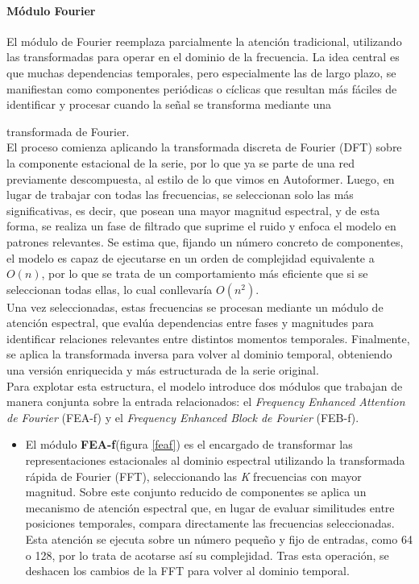 \paragraph{Módulo Fourier}

El módulo de Fourier reemplaza parcialmente la atención tradicional, utilizando las transformadas para operar en el dominio de la frecuencia. La idea central es que muchas dependencias temporales, pero especialmente las de largo plazo, se manifiestan como componentes periódicas o cíclicas que resultan más fáciles de identificar y procesar cuando la señal se transforma mediante una {transformada de Fourier.\\

El proceso comienza aplicando la transformada discreta de Fourier (DFT) sobre la componente estacional de la serie, por lo que ya se parte de una red previamente descompuesta, al estilo de lo que vimos en Autoformer. Luego, en lugar de trabajar con todas las frecuencias, se seleccionan solo las más significativas, es decir, que posean una mayor magnitud espectral, y de esta forma, se realiza un fase de filtrado que suprime el ruido y enfoca el modelo en patrones relevantes. Se estima que, fijando un número concreto de componentes, el modelo es capaz de ejecutarse en un orden de complejidad equivalente a $O(n)$, por lo que se trata de un comportamiento más eficiente que si se seleccionan todas ellas, lo cual conllevaría $O(n^2)$.\\

Una vez seleccionadas, estas frecuencias se procesan mediante un módulo de atención espectral, que evalúa dependencias entre fases y magnitudes para identificar relaciones relevantes entre distintos momentos temporales. Finalmente, se aplica la transformada inversa para volver al dominio temporal, obteniendo una versión enriquecida y más estructurada de la serie original.\\

Para explotar esta estructura, el modelo introduce dos módulos que trabajan de manera conjunta sobre la entrada relacionados: el \textit{Frequency Enhanced Attention de Fourier} (FEA-f) y el \textit{Frequency Enhanced Block de Fourier} (FEB-f).

\begin{itemize}
    \item El módulo \textbf{FEA-f}(figura \ref{feaf}) es el encargado de transformar las representaciones estacionales al dominio espectral utilizando la transformada rápida de Fourier (FFT), seleccionando las \textit{K} frecuencias con mayor magnitud. Sobre este conjunto reducido de componentes se aplica un mecanismo de atención espectral que, en lugar de evaluar similitudes entre posiciones temporales, compara directamente las frecuencias seleccionadas. Esta atención se ejecuta sobre un número pequeño y fijo de entradas, como 64 o 128, por lo trata de acotarse así su complejidad. Tras esta operación, se deshacen los cambios de la FFT para volver al dominio temporal.


\end{itemize}}
